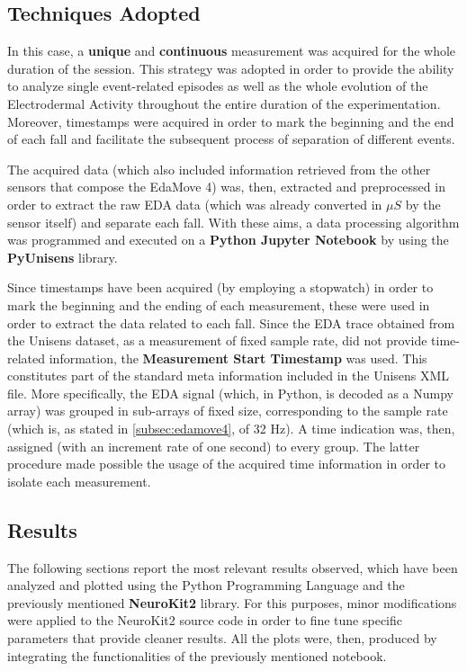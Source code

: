 \subsection{Techniques Adopted}\label{subsec:session-techniques}

In this case, a \textbf{unique} and \textbf{continuous} measurement was acquired for the whole duration of the session. This strategy was adopted in order to provide the ability to analyze single event-related episodes as well as the whole evolution of the Electrodermal Activity throughout the entire duration of the experimentation. Moreover, timestamps were acquired in order to mark the beginning and the end of each fall and facilitate the subsequent process of separation of different events.

The acquired data (which also included information retrieved from the other sensors that compose the EdaMove 4) was, then, extracted and preprocessed in order to extract the raw EDA data (which was already converted in $\mu S$ by the sensor itself) and separate each fall. With these aims, a data processing algorithm was programmed and executed on a \textbf{Python Jupyter Notebook} by using the \textbf{PyUnisens} library.

Since timestamps have been acquired (by employing a stopwatch) in order to mark the beginning and the ending of each measurement, these were used in order to extract the data related to each fall. Since the EDA trace obtained from the Unisens dataset, as a measurement of fixed sample rate, did not provide time-related information, the \textbf{Measurement Start Timestamp} was used. This constitutes part of the standard meta information included in the Unisens XML file. More specifically, the EDA signal (which, in Python, is decoded as a Numpy array) was grouped in sub-arrays of fixed size, corresponding to the sample rate (which is, as stated in \ref{subsec:edamove4}, of 32 Hz). A time indication was, then, assigned (with an increment rate of one second) to every group. The latter procedure made possible the usage of the acquired time information in order to isolate each measurement.

\subsection{Results}\label{subsec:results}

The following sections report the most relevant results observed, which have been analyzed and plotted using the Python Programming Language and the previously mentioned \textbf{NeuroKit2} library. For this purposes, minor modifications were applied to the NeuroKit2 source code in order to fine tune specific parameters that provide cleaner results. All the plots were, then, produced by integrating the functionalities of the previously mentioned notebook. 

